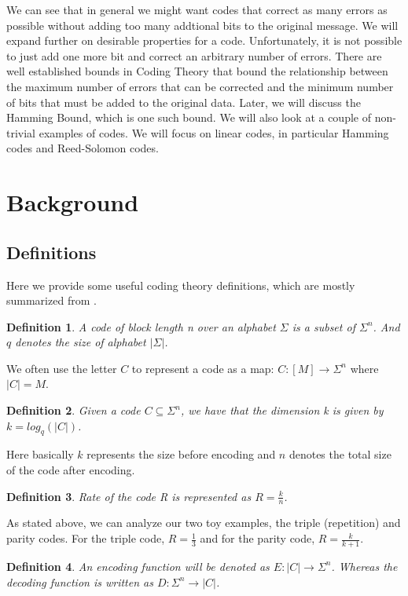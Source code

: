 \documentclass{article}
\newtheorem{Definition}{Definition}
\begin{document}
We can see that in general we might want codes that correct as many errors as possible without adding too many addtional bits to the original message. We will expand further on desirable properties for a code. Unfortunately, it is not possible to just add one more bit and correct an arbitrary number of errors. There are well established bounds in Coding Theory that bound the relationship between the maximum number of errors that can be corrected and the minimum number of bits that must be added to the original data. Later, we will discuss the Hamming Bound, which is one such bound. We will also look at a couple of non-trivial examples of codes. We will focus on linear codes, in particular Hamming codes and Reed-Solomon codes. 

\section{Background}
\subsection{Definitions}

\noindent Here we provide some useful coding theory definitions, which are mostly summarized from \cite{book}.

\begin{Definition}
A code of block length n over an alphabet $\Sigma$ is a subset of $\Sigma ^n$. And $q$ denotes the size of alphabet $|\Sigma|$. \cite{book}
\end{Definition}
\noindent We often use the letter $C$ to represent a code as a map: $C: [M] \rightarrow \Sigma^n$ where $|C| = M$.

\begin{Definition}
Given a code $C \subseteq \Sigma^n$, we have that the dimension k is given by $k = log_q(|C|)$.
\end{Definition}
\noindent Here basically $k$ represents the size before encoding and $n$ denotes the total size of the code after encoding. 
\begin{Definition}
Rate of the code R is represented as $R=\frac{k}{n}$.
\end{Definition}
\noindent As stated above, we can analyze our two toy examples, the triple (repetition) and parity codes.  For the triple code, $R=\frac{1}{3}$ and for the parity code, $R = \frac{k}{k+1}$.
\begin{Definition}
An encoding function will be denoted as $E:|C| \rightarrow \Sigma^n$. Whereas the decoding function is written as $D:\Sigma^n \rightarrow |C|$.
\end{Definition}
\end{document}
